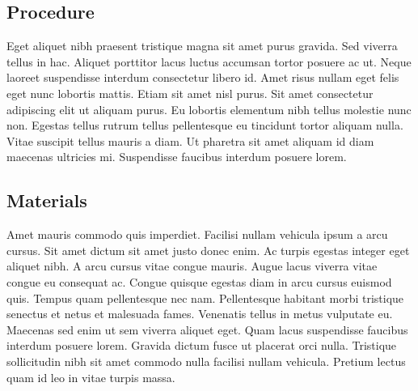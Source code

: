 \documentclass[letterpaper,\myfontsize]{article}
\begin{document}
\subsection{Procedure}

Eget aliquet nibh praesent tristique magna sit amet purus gravida. Sed viverra tellus in hac. Aliquet porttitor lacus luctus accumsan tortor posuere ac ut. Neque laoreet suspendisse interdum consectetur libero id. Amet risus nullam eget felis eget nunc lobortis mattis. Etiam sit amet nisl purus. Sit amet consectetur adipiscing elit ut aliquam purus. Eu lobortis elementum nibh tellus molestie nunc non. Egestas tellus rutrum tellus pellentesque eu tincidunt tortor aliquam nulla. Vitae suscipit tellus mauris a diam. Ut pharetra sit amet aliquam id diam maecenas ultricies mi. Suspendisse faucibus interdum posuere lorem.


\subsection{Materials}

Amet mauris commodo quis imperdiet. Facilisi nullam vehicula ipsum a arcu cursus. Sit amet dictum sit amet justo donec enim. Ac turpis egestas integer eget aliquet nibh. A arcu cursus vitae congue mauris. Augue lacus viverra vitae congue eu consequat ac. Congue quisque egestas diam in arcu cursus euismod quis. Tempus quam pellentesque nec nam. Pellentesque habitant morbi tristique senectus et netus et malesuada fames. Venenatis tellus in metus vulputate eu. Maecenas sed enim ut sem viverra aliquet eget. Quam lacus suspendisse faucibus interdum posuere lorem. Gravida dictum fusce ut placerat orci nulla. Tristique sollicitudin nibh sit amet commodo nulla facilisi nullam vehicula. Pretium lectus quam id leo in vitae turpis massa.











\end{document}
